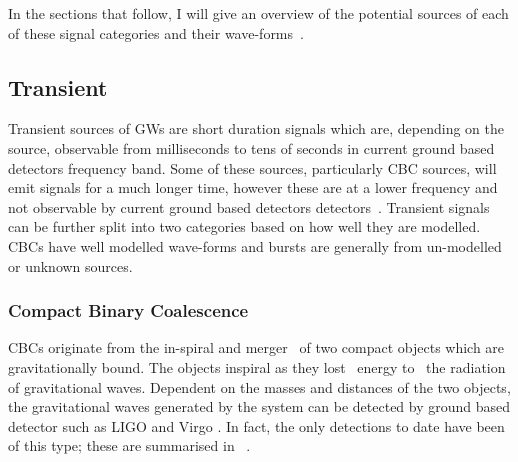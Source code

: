 In the sections that follow, I will give an overview of the potential sources
of each of these signal categories and their wave-forms~.


\subsection{\label{sources:transient}Transient}

Transient sources of \glspl{GW} are short duration signals which are, depending
on the source, observable from milliseconds to tens of seconds in current
ground based detectors frequency band.  Some of these sources, particularly
\gls{CBC} sources, will emit signals for a much longer time, however these are
at a lower frequency and not observable by current ground based detectors
detectors~. Transient signals can be
further split into two categories based on how well they are modelled.
\glspl{CBC} have well modelled wave-forms and bursts are generally from
un-modelled or unknown sources.

\subsubsection{\label{sources:transient:cbc}Compact Binary Coalescence}

\glspl{CBC} originate from the in-spiral and merger~ of
two compact objects which are gravitationally bound.  The objects inspiral as
they lost~ energy to~ the radiation of
gravitational waves.  Dependent on the masses and distances of the two objects,
the gravitational waves generated by the system can be detected by ground based
detector such as \gls{LIGO} \citep{aasi2015AdvancedLIGO} and Virgo
\citep{acernese2015AdvancedVirgo}.  In fact, the only detections to date have
been of this type; these are summarised in
\citep{ligoscientificcollaborationandvirgocollaboration2019GWTC1GravitationalWave}~.

